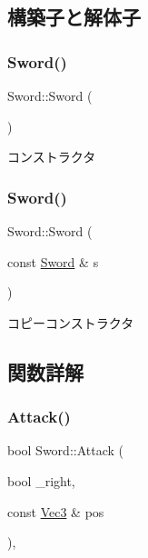 \subsection{構築子と解体子}
\mbox{\label{class_sword_af33284e40825ec8ddccd01fa5833be36}} 
\subsubsection{\texorpdfstring{Sword()}{Sword()}\hspace{0.1cm}{\footnotesize\ttfamily [1/2]}}
{\footnotesize\ttfamily Sword\+::\+Sword (\begin{DoxyParamCaption}{ }\end{DoxyParamCaption})}



コンストラクタ 

\mbox{\label{class_sword_a6a55d930547584000fcc7c63d47ffabf}} 
\subsubsection{\texorpdfstring{Sword()}{Sword()}\hspace{0.1cm}{\footnotesize\ttfamily [2/2]}}
{\footnotesize\ttfamily Sword\+::\+Sword (\begin{DoxyParamCaption}\item[{const \mbox{\hyperlink{class_sword}{Sword}} \&}]{s }\end{DoxyParamCaption})\hspace{0.3cm}{\ttfamily [inline]}}



コピーコンストラクタ 



\subsection{関数詳解}
\mbox{\label{class_sword_a6c8642e6a8f1d6152abce6c84bf6d21b}} 
\subsubsection{\texorpdfstring{Attack()}{Attack()}}
{\footnotesize\ttfamily bool Sword\+::\+Attack (\begin{DoxyParamCaption}\item[{bool}]{\+\_\+right,  }\item[{const \mbox{\hyperlink{common_8h_ab1cb35b3a17c398d8ef71d5f779808bf}{Vec3}} \&}]{pos }\end{DoxyParamCaption})\hspace{0.3cm}{\ttfamily [final]}, {\ttfamily [virtual]}}



